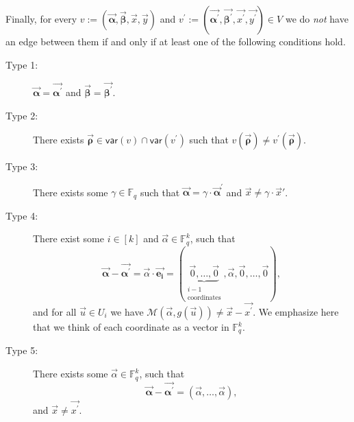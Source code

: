 \documentclass[10pt,a4paper]{article}
\newcommand{\F}{\mathbb{F}}
\newcommand{\alphab}{\vec{\bm{\alpha}}}
\newcommand{\betab}{\vec{\bm{\beta}}}
\newcommand{\var}{\mathsf{var}}
\newcommand{\M}{\mathcal{M}}
\begin{document}
 
Finally, for every $v:=(\alphab,\betab,\vec{x},\vec{y})$ and $v^{\prime}:=(\vec{\bm{\alpha^{\prime}}},\vec{\bm{\beta^{\prime}}},\vec{x^{\prime}},\vec{y^{\prime}})\in V$ we do \emph{not} have an edge between them if and only if at least one of the following conditions hold.
\begin{description}
\item[Type 1:] $\vec{\bm{\alpha}}=\vec{\bm{\alpha^{\prime}}}$ and $\vec{\bm{\beta}}=\vec{\bm{\beta^{\prime}}}$. 
\item[Type 2:] There exists $\vec{\bm \rho}\in \var(v)\cap\var(v^{\prime})$ such that $v(\vec{\bm \rho})\neq v^{\prime}(\vec{\bm \rho})$.
\item[Type 3:] There exists some $\gamma\in \F_q$ such that $\alphab=\gamma\cdot \alphab^\prime$ and $\vec{x}\neq \gamma \cdot \vec{x}'$.
\item[Type 4:] There exist some $i\in[k]$ and $\vec{\alpha}\in\F_q^k$, such that $$\vec{\bm{\alpha}}-\vec{\bm{\alpha^{\prime}}}=\vec{\alpha}\cdot \vec{\bm{e_i}}=(\underbrace{\vec{0},\ldots, \vec{0}}_{\substack{i-1\\ \text{coordinates}}},\vec{\alpha},\vec{0},\ldots, \vec{0}),$$
and for all $\vec{u}\in U_i$ we have $ \M(\vec{\alpha},g(\vec{u}))\neq\vec{x}-\vec{x^{\prime}}$. We emphasize here that we think of each coordinate as a vector in $\F_q^k$. 
\item[Type 5:] There exists some $\vec{\alpha}\in\F_q^k$, such that $$\vec{\bm{\alpha}}-\vec{\bm{\alpha^{\prime}}}=(\vec{\alpha},\ldots, \vec{\alpha}),$$
and  $\vec{x}\neq\vec{x^{\prime}}$.
\end{description}
\end{document}
